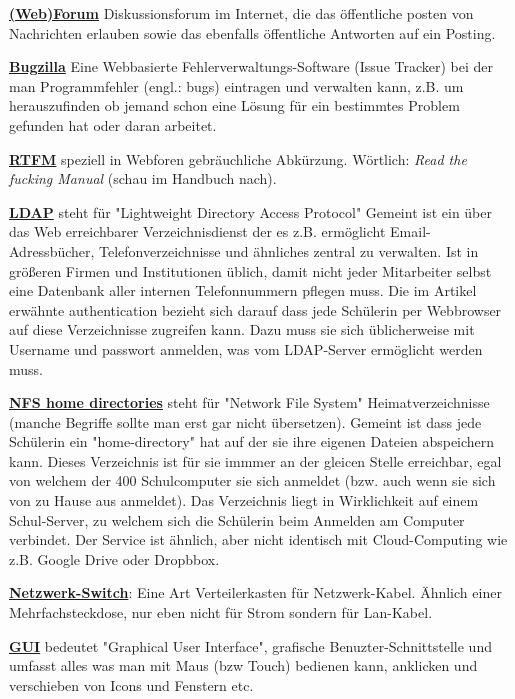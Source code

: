 \documentclass[10pt,a4paper,ngerman,twoside]{article} %
\begin{document}
\begin{multicols}{3}
\href{http://de.wikipedia.org/wiki/Webforum}{\textbf{(Web)Forum}} Diskussionsforum im Internet, die das öffentliche posten von Nachrichten erlauben sowie das ebenfalls öffentliche Antworten auf ein Posting. 

\href{http://de.wikipedia.org/wiki/Bugzilla}{\textbf{Bugzilla}} Eine Webbasierte Fehlerverwaltungs-Software (Issue Tracker) bei der man Programmfehler (engl.: bugs) eintragen und verwalten kann, z.B. um herauszufinden ob jemand schon eine Lösung für ein bestimmtes Problem gefunden hat oder daran arbeitet. 

\href{https://en.wikipedia.org/wiki/Rtfm}{\textbf{RTFM}} speziell in Webforen gebräuchliche Abkürzung. Wörtlich: \textit{Read the fucking Manual} (schau im Handbuch nach). 

\href{http://en.wikipedia.org/wiki/Ldap}{\textbf{LDAP}} steht für "Lightweight Directory Access Protocol" Gemeint ist ein über das Web erreichbarer Verzeichnisdienst der es z.B. ermöglicht Email-Adressbücher, Telefonverzeichnisse und ähnliches zentral zu verwalten. Ist in größeren Firmen und Institutionen üblich, damit nicht jeder Mitarbeiter selbst eine Datenbank aller internen Telefonnummern pflegen muss. Die im Artikel erwähnte authentication bezieht sich darauf dass jede Schülerin per Webbrowser auf diese Verzeichnisse zugreifen kann. Dazu muss sie sich üblicherweise mit Username und passwort anmelden, was vom LDAP-Server ermöglicht werden muss. 

\href{http://de.wikipedia.org/wiki/Network_File_System}{\textbf{NFS home directories}} steht für "Network File System" Heimatverzeichnisse (manche Begriffe sollte man erst gar nicht übersetzen). Gemeint ist dass jede Schülerin ein "home-directory" hat auf der sie ihre eigenen Dateien abspeichern kann. Dieses Verzeichnis ist für sie immmer an der gleicen Stelle erreichbar, egal von welchem der 400 Schulcomputer sie sich anmeldet (bzw. auch wenn sie sich von zu Hause aus anmeldet). Das Verzeichnis liegt in Wirklichkeit auf einem Schul-Server, zu welchem sich die Schülerin beim Anmelden am Computer verbindet. Der Service ist ähnlich, aber nicht identisch mit Cloud-Computing wie z.B. Google Drive oder Dropbbox. 

\href{http://de.wikipedia.org/wiki/Switch_(Netzwerktechnik)}{\textbf{Netzwerk-Switch}}: Eine Art Verteilerkasten für Netzwerk-Kabel. Ähnlich einer Mehrfachsteckdose, nur eben nicht für Strom sondern für Lan-Kabel. 

\href{http://en.wikipedia.org/wiki/Graphical_user_interface}{\textbf{GUI}} bedeutet "Graphical User Interface", grafische Benuzter-Schnittstelle und umfasst alles was man mit Maus (bzw Touch) bedienen kann, anklicken und verschieben von Icons und Fenstern etc.


\end{multicols}
\end{document}

